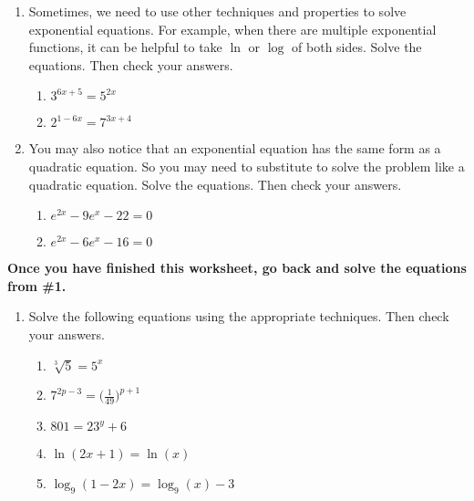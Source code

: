 \begin{enumerate}
\clearpage

\item Sometimes, we need to use other techniques and properties to
  solve exponential equations.  For example, when there are multiple
  exponential functions, it can be helpful to take $\ln$ or $\log$ of
  both sides.  Solve the equations.  Then check your answers.
\begin{enumerate}
\item $3^{6x+5}=5^{2x}$
\vfill

\item $2^{1-6x}=7^{3x+4}$
\vfill

\end{enumerate}
\clearpage

\item You may also notice that an exponential equation has the same
  form as a quadratic equation.  So you may need to substitute to
  solve the problem like a quadratic equation.  Solve the equations.
  Then check your answers.
\begin{enumerate}
\item $e^{2x}-9e^x-22=0$\vfill
\item $e^{2x}-6e^x-16=0$\vfill
\end{enumerate}


\end{enumerate}

\noindent \textbf{Once you have finished this worksheet, go back and
  solve the equations from \#1.}



\begin{enumerate}
\item Solve the following equations using the appropriate techniques.
  Then check your answers.
  \begin{enumerate}
  \item $\sqrt[3]{5}=5^x$
  \item $\displaystyle 7^{2p-3}=\Big(\frac{1}{49}\Big)^{p+1}$
  \item $801=23^y+6$
  \item $\ln(2x+1) = \ln(x)$
  \item $\log_9(1-2x) = \log_9(x) - 3$
  \end{enumerate}

\end{enumerate}
